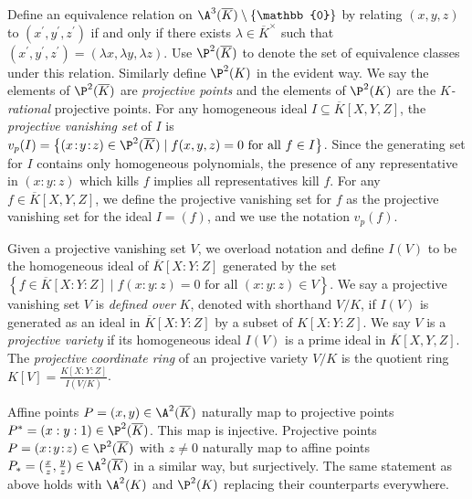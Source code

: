 \documentclass[11pt,letterpaper]{article}
\theoremstyle{definition}
\newcommand{\6}{\mathbf}
\newcommand{\7}{\mathcal}
\newcommand{\zero}{\mathbb{0}}
\begin{document}
Define an equivalence relation on $\A^3(\overline{K}) \setminus \left\{\zero\right\}$ by relating $(x,y,z)$ to $(x^\prime, y^\prime, z^\prime)$ if and only if there exists $\lambda \in \overline{K}^\times$ such that $(x^\prime, y^\prime, z^\prime) = (\lambda x, \lambda y, \lambda z)$. Use $\P^2(\overline{K})$ to denote the set of equivalence classes under this relation. Similarly define $\P^2(K)$ in the evident way. We say the elements of $\P^2(\overline{K})$ are \textit{projective points} and the elements of $\P^2(K)$ are the \textit{$K$-rational} projective points. For any homogeneous ideal $I \subseteq \overline{K}[X,Y,Z]$, the \textit{projective vanishing set} of $I$ is $v_p(I) = \left\{(x\!:\!y\!:\!z) \in \P^2(\overline{K}) \mid f(x,y,z)=0\text{ for all }f \in I\right\}$. Since the generating set for $I$ contains only homogeneous polynomials, the presence of any representative in $(x\!:\!y\!:\!z)$ which kills $f$ implies all representatives kill $f$. For any $f \in \overline{K}[X,Y,Z]$, we define the projective vanishing set for $f$ as the projective vanishing set for the ideal $I=(f)$, and we use the notation $v_p(f)$.



Given a projective vanishing set $V$, we overload notation and define $I(V)$ to be the homogeneous ideal of $\overline{K}[X\!:\!Y\!:\!Z]$ generated by the set $\left\{f \in \overline{K}[X\!:\!Y\!:\!Z] \mid f(x\!:\!y\!:\!z) = 0\text{ for all }(x\!:\!y\!:\!z) \in V\right\}$.
We say a projective vanishing set $V$ is \textit{defined over} $K$, denoted with shorthand $V/K$, if $I(V)$ is generated as an ideal in $\overline{K}[X\!:\!Y\!:\!Z]$ by a subset of $K[X\!:\!Y\!:\!Z]$. 
We say $V$ is a \textit{projective variety} if its homogeneous ideal $I(V)$ is a prime ideal in $\overline{K}[X,Y,Z]$. The \textit{projective coordinate ring} of an projective variety $V/K$ is the quotient ring $K[V] = \frac{K[X\!:\!Y\!:\!Z]}{I(V/K)}$. %


Affine points $P=(x,y) \in \A^2(\overline{K})$ naturally map to projective points $P^*=(x:y:1) \in \P^2(\overline{K})$. This map is injective. Projective points $P=(x\!:\!y\!:\!z) \in \P^2(\overline{K})$ with $z \neq 0$ naturally map to affine points $P_*=(\frac{x}{z}, \frac{y}{z}) \in \A^2(\overline{K})$ in a similar way, but surjectively. The same statement as above holds with $\A^2(K)$ and $\P^2(K)$ replacing their counterparts everywhere.
\end{document}
